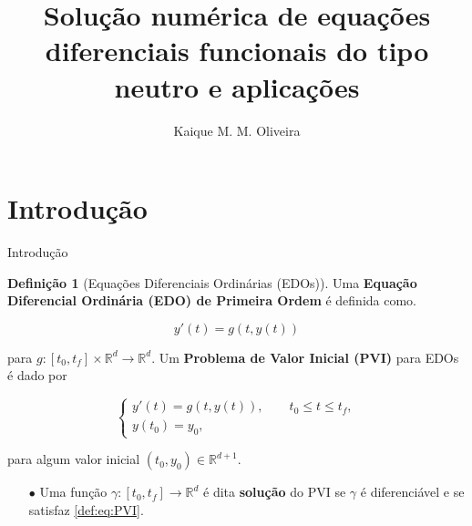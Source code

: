 \documentclass{beamer}
\title{Solução numérica de equações diferenciais funcionais do tipo neutro e aplicações}
\author[Kaique Oliveira]{Kaique M. M. Oliveira}
\newcommand{\R}{\mathbb{R}}
\theoremstyle{plain}
\theoremstyle{definition}
\newtheorem{defi}{Definição}
\begin{document}
\typesetFrontSlides






\section{Introdução}


\begin{frame}{Introdução}

    \footnotesize
    \begin{defi}[Equações Diferenciais Ordinárias (EDOs)]
        \label{def:1:EDO} 
        Uma \textbf{Equação Diferencial Ordinária (EDO) de Primeira Ordem} é definida como.

        \begin{equation}
            y'(t) = g(t, y(t))
        \end{equation}


        para $g: [t_0, t_f] \times \R^d \to \R^d$. Um \textbf{Problema de Valor Inicial (PVI)} para EDOs é dado por

        \begin{equation}
            \begin{cases}
                y'(t) = g(t, y(t)), \qquad t_0 \leq t\leq t_f,\\
                y(t_0) = y_0,
            \end{cases}
            \label{def:eq:PVI}
        \end{equation}


        para algum valor inicial $(t_0, y_0) \in \R^{d+1}$. 

        \begin{enumerate}
            \item[$\bullet$] Uma função $\gamma: [t_0, t_f] \to \R^d$ é dita \textbf{solução} do PVI se $\gamma$ é diferenciável e se satisfaz \ref{def:eq:PVI}.
        \end{enumerate}

    \end{defi}

\end{frame}

\end{document}
